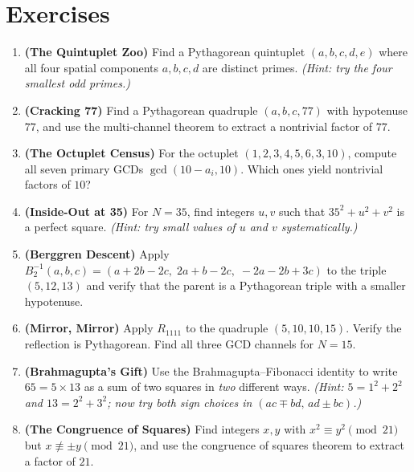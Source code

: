 \section{Exercises}
\begin{enumerate}
\def\labelenumi{\arabic{enumi}.}
\item
  \textbf{(The Quintuplet Zoo)} Find a Pythagorean quintuplet \((a, b, c, d, e)\) where all four spatial components \(a, b, c, d\) are distinct primes. \emph{(Hint: try the four smallest odd primes.)}
\item
  \textbf{(Cracking 77)} Find a Pythagorean quadruple \((a, b, c, 77)\) with hypotenuse \(77\), and use the multi-channel theorem to extract a nontrivial factor of \(77\).
\item
  \textbf{(The Octuplet Census)} For the octuplet \((1, 2, 3, 4, 5, 6, 3, 10)\), compute all seven primary GCDs \(\gcd(10 - a_i, 10)\). Which ones yield nontrivial factors of \(10\)?
\item
  \textbf{(Inside-Out at 35)} For \(N = 35\), find integers \(u, v\) such that \(35^2 + u^2 + v^2\) is a perfect square. \emph{(Hint: try small values of \(u\) and \(v\) systematically.)}
\item
  \textbf{(Berggren Descent)} Apply \(B_2^{-1}(a, b, c) = (a + 2b - 2c,\; 2a + b - 2c,\; -2a - 2b + 3c)\) to the triple \((5, 12, 13)\) and verify that the parent is a Pythagorean triple with a smaller hypotenuse.
\item
  \textbf{(Mirror, Mirror)} Apply \(R_{1111}\) to the quadruple \((5, 10, 10, 15)\). Verify the reflection is Pythagorean. Find all three GCD channels for \(N = 15\).
\item
  \textbf{(Brahmagupta's Gift)} Use the Brahmagupta--Fibonacci identity to write \(65 = 5 \times 13\) as a sum of two squares in \emph{two} different ways. \emph{(Hint: \(5 = 1^2 + 2^2\) and \(13 = 2^2 + 3^2\); now try both sign choices in \((ac \mp bd, \, ad \pm bc)\).)}
\item
  \textbf{(The Congruence of Squares)} Find integers \(x, y\) with \(x^2 \equiv y^2 \pmod{21}\) but \(x \not\equiv \pm y \pmod{21}\), and use the congruence of squares theorem to extract a factor of \(21\).
\end{enumerate}
